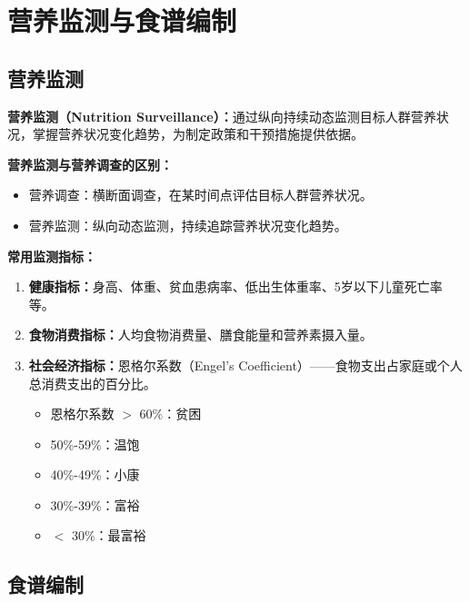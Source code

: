 \section{营养监测与食谱编制}

\subsection{营养监测}

\begin{defbox}
\textbf{营养监测（Nutrition Surveillance）：}通过纵向持续动态监测目标人群营养状况，掌握营养状况变化趋势，为制定政策和干预措施提供依据。

\textbf{营养监测与营养调查的区别：}
\begin{itemize}[leftmargin=*]
    \item 营养调查：横断面调查，在某时间点评估目标人群营养状况。
    \item 营养监测：纵向动态监测，持续追踪营养状况变化趋势。
\end{itemize}

\textbf{常用监测指标：}
\begin{enumerate}[leftmargin=*]
    \item \textbf{健康指标：}身高、体重、贫血患病率、低出生体重率、5岁以下儿童死亡率等。
    \item \textbf{食物消费指标：}人均食物消费量、膳食能量和营养素摄入量。
    \item \textbf{社会经济指标：}恩格尔系数（Engel's Coefficient）——食物支出占家庭或个人总消费支出的百分比。
    \begin{itemize}[leftmargin=*]
        \item 恩格尔系数 $>$ 60\%：贫困
        \item 50\%-59\%：温饱
        \item 40\%-49\%：小康
        \item 30\%-39\%：富裕
        \item $<$ 30\%：最富裕
    \end{itemize}
\end{enumerate}
\end{defbox}

\subsection{食谱编制}

